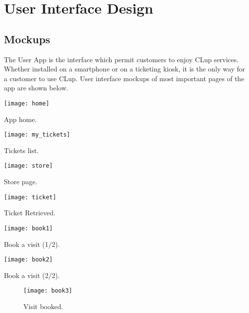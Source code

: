 \chapter{User Interface Design}
\section{Mockups}
The User App is the interface which permit customers to enjoy CLup services. Whether installed on a smartphone or on a ticketing kiosk, it is the only way for a customer to use CLup.
User interface mockups of most important pages of the app are shown below.

\vspace{0.5cm}
\begin{minipage}{.5\textwidth}
	\centering
	\texttt{[image: home]}
	\captionsetup{type=figure}
	\caption{App home.}
\end{minipage}%
\begin{minipage}{.5\textwidth}
	\centering
	\texttt{[image: my\_tickets]}
	\captionsetup{type=figure}
	\caption{Tickets list.}
\end{minipage}

\clearpage

\begin{minipage}{.5\textwidth}
	\centering
	\texttt{[image: store]}
	\captionsetup{type=figure}
	\caption{Store page.}
\end{minipage}%
\begin{minipage}{.5\textwidth}
	\centering
	\texttt{[image: ticket]}
	\captionsetup{type=figure}
	\caption{Ticket Retrieved.}
\end{minipage}

\vspace{1cm}

\begin{minipage}{.5\textwidth}
	\centering
	\texttt{[image: book1]}
	\captionsetup{type=figure}
	\caption{Book a visit (1/2).}
\end{minipage}%
\begin{minipage}{.5\textwidth}
	\centering
	\texttt{[image: book2]}
	\captionsetup{type=figure}
	\caption{Book a visit (2/2).}
\end{minipage}

\vspace{1cm}

\begin{figure}[H]
	\centering
	\texttt{[image: book3]}
	\caption{Visit booked.}
\end{figure}


